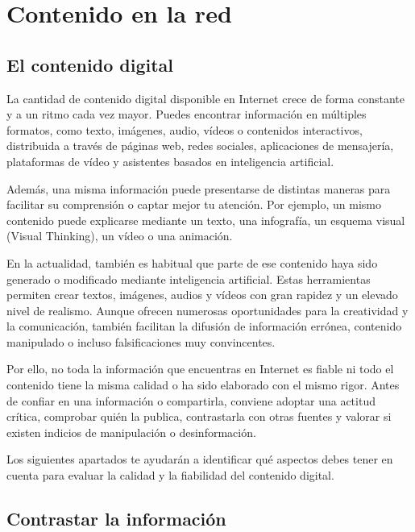 \documentclass[
  spanish,
  a4paper,
  openany]{book}
\begin{document}
\chapter{Contenido en la red}\label{contenido-en-la-red}

\section{El contenido digital}\label{el-contenido-digital}

La cantidad de contenido digital disponible en Internet crece de forma constante y a un ritmo cada vez mayor. Puedes encontrar información en múltiples formatos, como texto, imágenes, audio, vídeos o contenidos interactivos, distribuida a través de páginas web, redes sociales, aplicaciones de mensajería, plataformas de vídeo y asistentes basados en inteligencia artificial.

Además, una misma información puede presentarse de distintas maneras para facilitar su comprensión o captar mejor tu atención. Por ejemplo, un mismo contenido puede explicarse mediante un texto, una infografía, un esquema visual (Visual Thinking), un vídeo o una animación.

En la actualidad, también es habitual que parte de ese contenido haya sido generado o modificado mediante inteligencia artificial. Estas herramientas permiten crear textos, imágenes, audios y vídeos con gran rapidez y un elevado nivel de realismo. Aunque ofrecen numerosas oportunidades para la creatividad y la comunicación, también facilitan la difusión de información errónea, contenido manipulado o incluso falsificaciones muy convincentes.

Por ello, no toda la información que encuentras en Internet es fiable ni todo el contenido tiene la misma calidad o ha sido elaborado con el mismo rigor. Antes de confiar en una información o compartirla, conviene adoptar una actitud crítica, comprobar quién la publica, contrastarla con otras fuentes y valorar si existen indicios de manipulación o desinformación.

Los siguientes apartados te ayudarán a identificar qué aspectos debes tener en cuenta para evaluar la calidad y la fiabilidad del contenido digital.

\section{Contrastar la información}\label{contrastar-la-informaciuxf3n}
\end{document}
